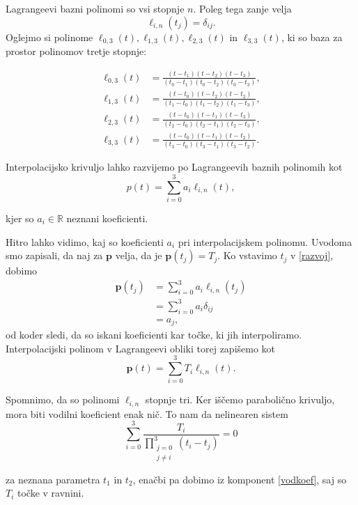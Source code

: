 \documentclass[mat1]{fmfdelo}
\newcommand{\R}{\mathbb R}
\begin{document}
Lagrangeevi bazni polinomi so vsi stopnje $n$. Poleg tega zanje velja $$\ell_{i,n}(t_j) = \delta_{ij}.$$
Oglejmo si polinome $ \ell_{0,3}(t), \ell_{1,3}(t), \ell_{2,3}(t)$ in $ \ell_{3,3}(t) $, ki so baza za prostor polinomov tretje stopnje:

\begin{align*}
	\ell_{0,3}(t) &= \frac{(t - t_1)(t - t_2)(t - t_3)}{(t_0 - t_1)(t_0 - t_2)(t_0 - t_3)}, \\
	\ell_{1,3}(t) &= \frac{(t - t_0)(t - t_2)(t - t_2)}{(t_1 - t_0)(t_1 - t_2)(t_1 - t_3)}, \\
	\ell_{2,3}(t) &= \frac{(t - t_0)(t - t_1)(t - t_3)}{(t_2 - t_0)(t_2 - t_1)(t_2 - t_3)}, \\
	\ell_{3,3}(t) &= \frac{(t - t_0)(t - t_1)(t - t_2)}{(t_3 - t_0)(t_3 - t_1)(t_3 - t_2)}. 	
\end{align*}

Interpolacijsko krivuljo lahko razvijemo po Lagrangeevih baznih polinomih kot 
\begin{equation}\label{razvoj}
p(t) = \sum_{i=0}^{3} a_i \ell_{i,n}(t),
\end{equation}

kjer so $a_i \in \R$ neznani koeficienti.

Hitro lahko vidimo, kaj so koeficienti $a_i$ pri interpolacijskem polinomu. Uvodoma smo zapisali, da naj za $\textbf{p}$ velja, da je $\textbf{p}(t_j) = T_j$. Ko vstavimo $t_j$ v \eqref{razvoj}, dobimo
\begin{align*}
\textbf{p}(t_j) &=  \sum_{i=0}^{3} a_i \ell_{i,n}(t_j) \\
	 &= \sum_{i=0}^{3} a_i \delta_{ij} \\
	&= a_j
,\end{align*}
od koder sledi, da so iskani koeficienti kar točke, ki jih interpoliramo. Interpolacijski polinom v Lagrangeevi obliki torej zapišemo kot 
$$\textbf{p}(t) = \sum_{i=0}^{3} T_i \ell_{i,n}(t).$$

Spomnimo, da so polinomi $\ell_{i,n}$ stopnje tri. Ker iščemo parabolično krivuljo, mora biti vodilni koeficient enak nič. To nam da nelinearen sistem
\begin{equation}\label{vodkoef}
\sum_{i = 0}^{3} \frac{T_i}{\prod_{\substack{j = 0 \\ j \neq i}}^3(t_i - t_j)} = 0
\end{equation}

za neznana parametra $t_1$ in $t_2$, enačbi pa dobimo iz komponent \eqref{vodkoef}, saj so $T_i$ točke v ravnini.
\end{document}
